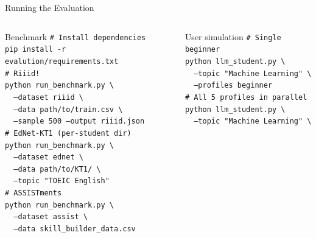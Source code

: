\documentclass[aspectratio=169,12pt]{beamer}
\begin{document}
\begin{frame}{Running the Evaluation}
  \begin{columns}
      \begin{block}{Benchmark}
        \scriptsize
        \texttt{\# Install dependencies}\\
        \texttt{pip install -r evalution/requirements.txt}\\[6pt]
        \texttt{\# Riiid!}\\
        \texttt{python run\_benchmark.py \textbackslash}\\
        \texttt{\ \ --dataset riiid \textbackslash}\\
        \texttt{\ \ --data path/to/train.csv \textbackslash}\\
        \texttt{\ \ --sample 500 --output riiid.json}\\[6pt]
        \texttt{\# EdNet-KT1 (per-student dir)}\\
        \texttt{python run\_benchmark.py \textbackslash}\\
        \texttt{\ \ --dataset ednet \textbackslash}\\
        \texttt{\ \ --data path/to/KT1/ \textbackslash}\\
        \texttt{\ \ --topic "TOEIC English"}\\[6pt]
        \texttt{\# ASSISTments}\\
        \texttt{python run\_benchmark.py \textbackslash}\\
        \texttt{\ \ --dataset assist \textbackslash}\\
        \texttt{\ \ --data skill\_builder\_data.csv}
      \end{block}
      \begin{block}{User simulation}
        \scriptsize
        \texttt{\# Single beginner}\\
        \texttt{python llm\_student.py \textbackslash}\\
        \texttt{\ \ --topic "Machine Learning" \textbackslash}\\
        \texttt{\ \ --profiles beginner}\\[6pt]
        \texttt{\# All 5 profiles in parallel}\\
        \texttt{python llm\_student.py \textbackslash}\\
        \texttt{\ \ --topic "Machine Learning" \textbackslash}\\

\end{block}
\end{columns}
\end{frame}
\end{document}
